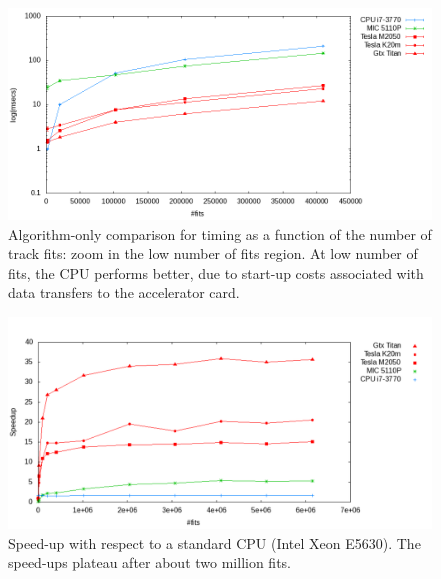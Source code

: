 \documentclass[a4]{jpconf}
\begin{document}
  \begin{figure}[!tbp]
    \centering
    \includegraphics[width=0.9\linewidth]{figures/TimeCompZoom_MIC.png} 
    \caption{Algorithm-only comparison for timing as a function of the
      number of track fits: zoom in the low number of fits region. At
      low number of fits, the CPU performs better, due to start-up
      costs associated with data transfers to the accelerator card.}
    \label{fig:algo_only_timing_zoom}
  \end{figure}
 
 \begin{figure}[!tbp]
   \centering
   \includegraphics[width=0.9\linewidth]{figures/Speedup_MIC}
   \caption{Speed-up with respect to a standard CPU (Intel Xeon
     E5630). The speed-ups plateau after about two million fits.}
   \label{fig:algo_only_speedup}
 \end{figure}
\end{document}
